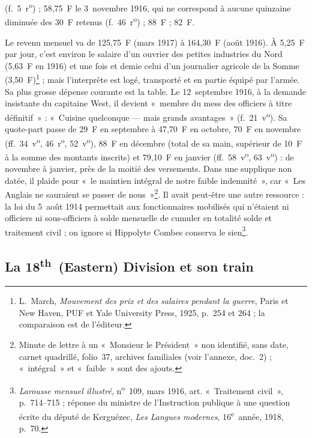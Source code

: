 (f.~5~r\textsuperscript{o}) ; 58,75~F le 3~novembre 1916, qui ne correspond à aucune quinzaine diminuée des 30~F retenus (f.~46~r\textsuperscript{o}) ; 88~F ; 82~F.

Le revenu mensuel va de 125,75~F (mars 1917) à 164,30~F (août 1916). À 5,25~F par jour, c'est environ le salaire d'un ouvrier des petites industries du Nord (5,63~F en 1916) et une fois et demie celui d'un journalier agricole de la Somme (3,50~F)\footnote{L.~March, \textit{Mouvement des prix et des salaires pendant la guerre}, Paris et New Haven, PUF et Yale University Press, 1925, p.~254 et 264 ; la comparaison est de l'éditeur.} ; mais l'interprète est logé, transporté et en partie équipé par l'armée. Sa plus grosse dépense courante est la table. Le 12~septembre 1916\label{intro:mess}, à la demande insistante du capitaine West, il devient «~membre du mess des officiers à titre définitif~» : «~Cuisine quelconque --- mais grands avantages~» (f.~21~v\textsuperscript{o}). Sa quote-part passe de 29~F en septembre à 47,70~F en octobre, 70~F en novembre (ff.~34~v\textsuperscript{o}, 46~r\textsuperscript{o}, 52~v\textsuperscript{o}), 88~F en décembre (total de sa main, supérieur de 10~F à la somme des montants inscrits) et 79,10~F en janvier (ff.~58~v\textsuperscript{o}, 63~v\textsuperscript{o}) : de novembre à janvier, près de la moitié des versements. Dans une supplique non datée, il plaide pour «~le maintien intégral de notre faible indemnité~», car «~Les Anglais ne sauraient se passer de nous~»\footnote{Minute de lettre à un «~Monsieur le Président~» non identifié, sans date, carnet quadrillé, folio~37, archives familiales (voir l'annexe, doc.~2) ; «~intégral~» et «~faible~» sont des ajouts.}. Il avait peut-être une autre ressource : la loi du 5~août 1914 permettait aux fonctionnaires mobilisés qui n'étaient ni officiers ni sous-officiers à solde mensuelle de cumuler en totalité solde et traitement civil ; on ignore si Hippolyte Combes conserva le sien\footnote{\textit{Larousse mensuel illustré}, n\textsuperscript{o}~109, mars 1916, art. «~Traitement civil~», p.~714--715 ; réponse du ministre de l'Instruction publique à une question écrite du député de Kerguézec, \textit{Les Langues modernes}, 16\textsuperscript{e}~année, 1918, p.~70.}.

\subsection{La 18\textsuperscript{th}~(Eastern) Division et son train}

